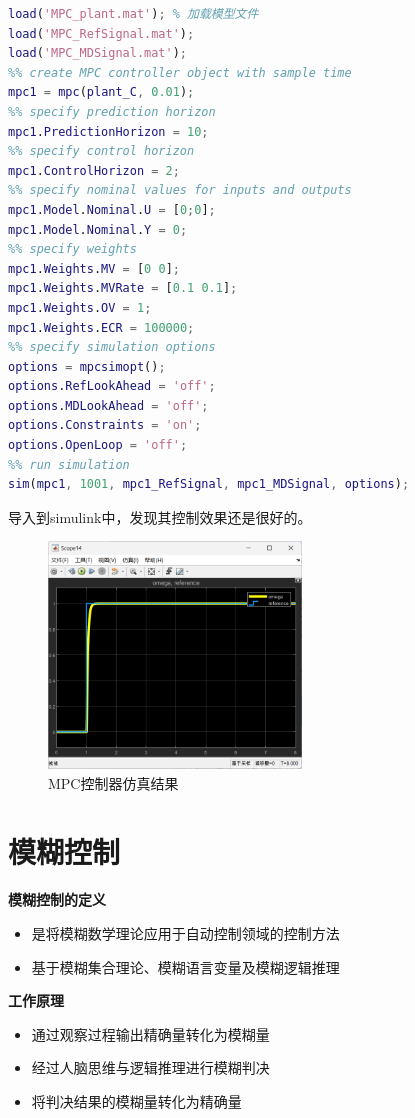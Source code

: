 \documentclass[12pt,a4paper,UTF8]{article}
\begin{document}
\begin{lstlisting}[language=Matlab,caption=MPC控制器设计]
load('MPC_plant.mat'); % 加载模型文件
load('MPC_RefSignal.mat');
load('MPC_MDSignal.mat');
%% create MPC controller object with sample time
mpc1 = mpc(plant_C, 0.01);
%% specify prediction horizon
mpc1.PredictionHorizon = 10;
%% specify control horizon
mpc1.ControlHorizon = 2;
%% specify nominal values for inputs and outputs
mpc1.Model.Nominal.U = [0;0];
mpc1.Model.Nominal.Y = 0;
%% specify weights
mpc1.Weights.MV = [0 0];
mpc1.Weights.MVRate = [0.1 0.1];
mpc1.Weights.OV = 1;
mpc1.Weights.ECR = 100000;
%% specify simulation options
options = mpcsimopt();
options.RefLookAhead = 'off';
options.MDLookAhead = 'off';
options.Constraints = 'on';
options.OpenLoop = 'off';
%% run simulation
sim(mpc1, 1001, mpc1_RefSignal, mpc1_MDSignal, options);
\end{lstlisting}

导入到simulink中，发现其控制效果还是很好的。

\begin{figure}[htbp] \centering \includegraphics[width=0.6\textwidth]{2024-12-30-12-14-05.png} \caption{MPC控制器仿真结果}\end{figure}

\clearpage
\section{模糊控制}

\textbf{模糊控制的定义}
\begin{itemize}
    \item 是将模糊数学理论应用于自动控制领域的控制方法
    \item 基于模糊集合理论、模糊语言变量及模糊逻辑推理
\end{itemize}

\textbf{工作原理}
\begin{itemize}
    \item 通过观察过程输出精确量转化为模糊量
    \item 经过人脑思维与逻辑推理进行模糊判决
    \item 将判决结果的模糊量转化为精确量
\end{itemize}
\end{document}
